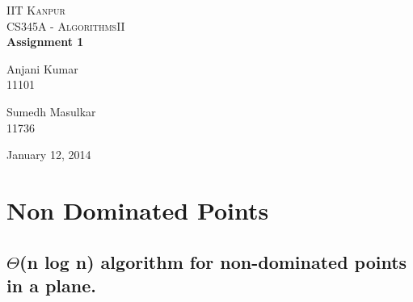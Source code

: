 \documentclass[pdftex,a4paper,12pt]{report}
\begin{document}
\begin{titlepage}
\begin{center}

\textsc{\LARGE IIT Kanpur}\\[1.5cm]

\textsc{\Large CS345A - AlgorithmsII}\\[0.5cm]

{ \huge \bfseries Assignment 1 \\[0.4cm] }


\begin{minipage}{0.4\textwidth}
\begin{flushleft} \large
Anjani Kumar\\
11101
\end{flushleft}
\end{minipage}
\begin{minipage}{0.4\textwidth}
\begin{flushright} \large
Sumedh Masulkar\\
11736
\end{flushright}
\end{minipage}

\vfill

{\large January 12, 2014}

\end{center}
\end{titlepage}

\section {Non Dominated Points}
\subsection {$\Theta$(n log n) algorithm for non-dominated points in a plane.}
\end{document}
